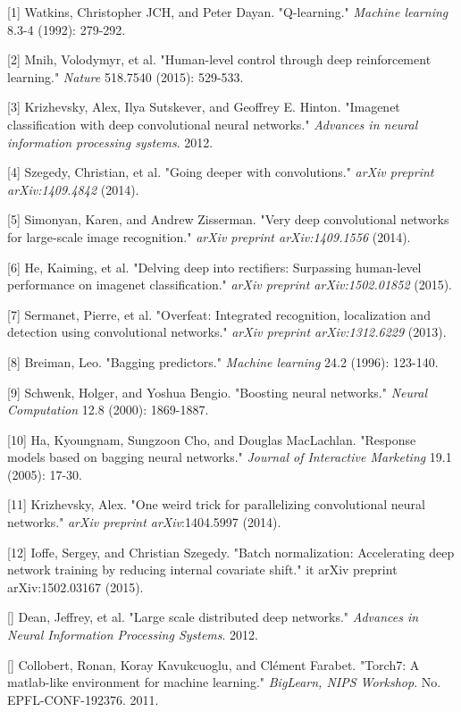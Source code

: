 \documentclass{article} %
\begin{document}
\small{
[1] Watkins, Christopher JCH, and Peter Dayan. "Q-learning." {\it Machine learning} 8.3-4 (1992): 279-292.

[2] Mnih, Volodymyr, et al. "Human-level control through deep reinforcement 
learning." {\it Nature} 518.7540 (2015): 529-533.

[3] Krizhevsky, Alex, Ilya Sutskever, and Geoffrey E. Hinton. "Imagenet classification with deep convolutional neural networks." {\it Advances in neural information processing systems}. 2012.

[4] Szegedy, Christian, et al. "Going deeper with convolutions." {\it arXiv preprint arXiv:1409.4842} (2014).

[5] Simonyan, Karen, and Andrew Zisserman. "Very deep convolutional networks for large-scale image recognition." {\it arXiv preprint arXiv:1409.1556} (2014).

[6] He, Kaiming, et al. "Delving deep into rectifiers: Surpassing human-level performance on imagenet classification." {\it arXiv preprint arXiv:1502.01852} (2015).

[7] Sermanet, Pierre, et al. "Overfeat: Integrated recognition, localization and detection using convolutional networks." {\it arXiv preprint arXiv:1312.6229} (2013).

[8] Breiman, Leo. "Bagging predictors." {\it Machine learning} 24.2 (1996): 123-140.

[9] Schwenk, Holger, and Yoshua Bengio. "Boosting neural networks." {\it Neural Computation} 12.8 (2000): 1869-1887.

[10] Ha, Kyoungnam, Sungzoon Cho, and Douglas MacLachlan. "Response models based on bagging neural networks." {\it Journal of Interactive Marketing} 19.1 (2005): 17-30.

[11] Krizhevsky, Alex. "One weird trick for parallelizing convolutional neural networks." {\it arXiv preprint arXiv}:1404.5997 (2014).

[12] Ioffe, Sergey, and Christian Szegedy. "Batch normalization: Accelerating deep network training by reducing internal covariate shift." {it arXiv preprint arXiv}:1502.03167 (2015).

[] Dean, Jeffrey, et al. "Large scale distributed deep networks." {\it Advances in Neural Information Processing Systems}. 2012.

[] Collobert, Ronan, Koray Kavukcuoglu, and Clément Farabet. "Torch7: A matlab-like environment for machine learning." {\it BigLearn, NIPS Workshop}. No. EPFL-CONF-192376. 2011.
}
\end{document}
